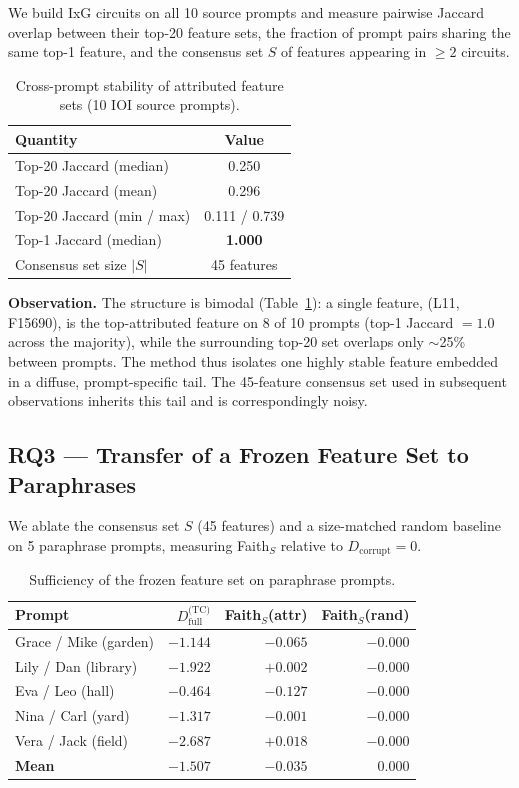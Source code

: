 \documentclass{article}
\begin{document}
We build IxG circuits on all 10 source prompts and measure pairwise Jaccard
overlap between their top-20 feature sets, the fraction of prompt pairs sharing
the same top-1 feature, and the consensus set $S$ of features appearing in
$\geq 2$ circuits.

\begin{table}[h]
\centering
\caption{Cross-prompt stability of attributed feature sets (10 IOI source prompts).}
\label{tab:stability}
\begin{tabular}{lc}
\toprule
Quantity & Value \\
\midrule
Top-20 Jaccard (median)   & 0.250 \\
Top-20 Jaccard (mean)     & 0.296 \\
Top-20 Jaccard (min / max) & 0.111 / 0.739 \\
Top-1 Jaccard (median)    & \textbf{1.000} \\
Consensus set size $|S|$  & 45 features \\
\bottomrule
\end{tabular}
\end{table}

\textbf{Observation.} The structure is bimodal (Table~\ref{tab:stability}): a
single feature, (L11, F15690), is the top-attributed feature on 8 of 10 prompts
(top-1 Jaccard $= 1.0$ across the majority), while the surrounding top-20 set
overlaps only $\sim$25\% between prompts. The method thus isolates one highly
stable feature embedded in a diffuse, prompt-specific tail. The 45-feature
consensus set used in subsequent observations inherits this tail and is
correspondingly noisy.

\subsection{RQ3 --- Transfer of a Frozen Feature Set to Paraphrases}

We ablate the consensus set $S$ (45 features) and a size-matched random
baseline on 5 paraphrase prompts, measuring Faith$_S$ relative to
$D_\text{corrupt} = 0$.

\begin{table}[h]
\centering
\caption{Sufficiency of the frozen feature set on paraphrase prompts.}
\label{tab:transfer}
\begin{tabular}{lrrr}
\toprule
Prompt & $D_\text{full}^\text{(TC)}$ & Faith$_S$(attr) & Faith$_S$(rand) \\
\midrule
Grace / Mike (garden) & $-1.144$ & $-0.065$ & $-0.000$ \\
Lily / Dan (library)  & $-1.922$ & $+0.002$ & $-0.000$ \\
Eva / Leo (hall)      & $-0.464$ & $-0.127$ & $-0.000$ \\
Nina / Carl (yard)    & $-1.317$ & $-0.001$ & $-0.000$ \\
Vera / Jack (field)   & $-2.687$ & $+0.018$ & $-0.000$ \\
\midrule
\textbf{Mean}         & $-1.507$ & $\mathbf{-0.035}$ & $\mathbf{0.000}$ \\
\bottomrule
\end{tabular}
\end{table}
\end{document}
